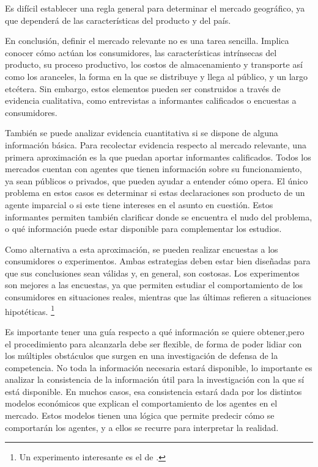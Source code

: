\documentclass[
  12pt,
  spanish,
]{book}
\begin{document}
Es difícil establecer una regla general para determinar el mercado geográfico, ya que dependerá de las características del producto y del país.

En conclusión, definir el mercado relevante no es una tarea sencilla. Implica conocer cómo actúan los consumidores, las características intrínsecas del producto, su proceso productivo, los costos de almacenamiento y transporte así como los aranceles, la forma en la que se distribuye y llega al público, y un largo etcétera. Sin embargo, estos elementos pueden ser construidos a través de evidencia cualitativa, como entrevistas a informantes calificados o encuestas a consumidores.

También se puede analizar evidencia cuantitativa si se dispone de alguna información básica. Para recolectar evidencia respecto al mercado relevante, una primera aproximación es la que puedan aportar informantes calificados. Todos los mercados cuentan con agentes que tienen información sobre su funcionamiento, ya sean públicos o privados, que pueden ayudar a entender cómo opera. El único problema en estos casos es determinar si estas declaraciones son producto de un agente imparcial o si este tiene intereses en el asunto en cuestión. Estos informantes permiten también clarificar donde se encuentra el nudo del problema, o qué información puede estar disponible para complementar los estudios.

Como alternativa a esta aproximación, se pueden realizar encuestas a los consumidores o experimentos. Ambas estrategias deben estar bien diseñadas para que sus conclusiones sean válidas y, en general, son costosas. Los experimentos son mejores a las encuestas, ya que permiten estudiar el comportamiento de los consumidores en situaciones reales, mientras que las últimas refieren a situaciones hipotéticas.
\footnote{Un experimento interesante es el de \citet{Conlon2013}.}

Es importante tener una guía respecto a qué información se quiere obtener,pero el procedimiento para alcanzarla debe ser flexible, de forma de poder lidiar con los múltiples obstáculos que surgen en una investigación de defensa de la competencia. No toda la información necesaria estará disponible, lo importante es analizar la consistencia de la información útil para la investigación con la que sí está disponible. En muchos casos, esa consistencia estará dada por los distintos modelos económicos que explican el comportamiento de los agentes en el mercado. Estos modelos tienen una lógica que permite predecir cómo se comportarán los agentes, y a ellos se recurre para interpretar la realidad.
\end{document}
